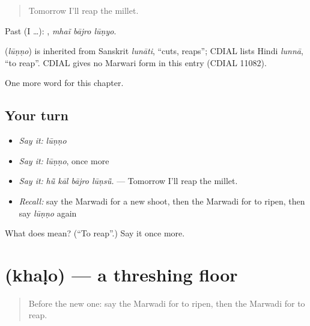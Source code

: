 \begin{quote}
Tomorrow I'll reap the millet.
\end{quote}

Past (I …):   , \emph{mhaĩ bājro lūṇyo}.

\begin{cousinweb}
\textbf{} (\emph{lūṇṇo}) is inherited from Sanskrit \emph{lunāti}, \textquotedblleft{}cuts, reaps\textquotedblright{}; CDIAL lists Hindi \emph{lunnā}, \textquotedblleft{}to reap\textquotedblright{}. CDIAL gives no Marwari form in this entry (CDIAL 11082).
\end{cousinweb}

\begin{grammarlens}[title={What you've built}]
One more word for this chapter.
\end{grammarlens}

\subsection*{Your turn}
\begin{itemize}
\raggedright
  \item \emph{Say it:} \emph{lūṇṇo}
  \item \emph{Say it:} \emph{lūṇṇo}, once more
  \item \emph{Say it:} \emph{hū̃ kāl bājro lūṇsū̃.} — Tomorrow I'll reap the millet.
  \item \emph{Recall:} say the Marwadi for a new shoot, then the Marwadi for to ripen, then say \emph{lūṇṇo} again
\end{itemize}

\begin{tcolorbox}[breakable,colback=teal!4,colframe=teal!35!black,title={Before you move on}]
What does  mean? (\textquotedblleft{}To reap\textquotedblright{}.) Say it once more.
\end{tcolorbox}
\section[\texorpdfstring{\mw{खळो} (khaḷo)}{खळो (khaḷo)}]{ (khaḷo) — a threshing floor}

\label{lesson:MW-C240-khalo}



\begin{quote}
Before the new one: say the Marwadi for to ripen, then the Marwadi for to reap.
\end{quote}

